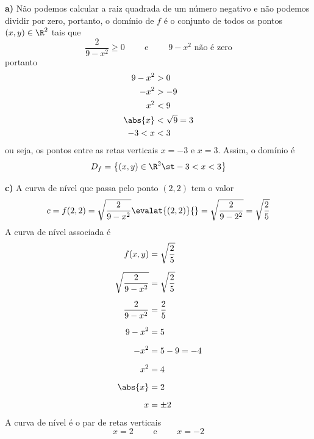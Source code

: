\documentclass[a4paper,12pt,fleqn]{article}
\begin{document}
\begin{answer}
  \textbf{a)} \quad
  Não podemos calcular a raiz quadrada de um número negativo e não
  podemos dividir por zero, portanto, o domínio de $f$ é o conjunto
  de todos os pontos \((x, y)\in\R^2\) tais que
  \[
    \frac{2}{9 - x^2} \geq 0 \qquad\text{ e }\qquad 9 - x^2 \text{ não é zero}
  \]
  portanto
  \begin{align*}
    9 - x^2 & > 0            \\
    -x^2    & > -9           \\
    x^2     & < 9            \\
    \abs{x} & < \sqrt{9} = 3 \\
    -3 < x  & < 3
  \end{align*}
  ou seja, os pontos entre as retas verticais \(x=-3\) e \(x=3\).
  Assim, o domínio é
  \[
    D_f = \left\{(x, y) \in \R^2 \st -3 < x < 3 \right\}
  \]

  \bigskip
  \textbf{c)} \quad
  A curva de nível que passa pelo ponto $(2, 2)$ tem o valor
  \[
    c
    = f(2, 2)
    = \sqrt{\frac{2}{9 - x^2}} \evalat{(2, 2)}{}
    = \sqrt{\frac{2}{9 - 2^2}}
    = \sqrt{\frac{2}{5}}
  \]
  A curva de nível associada é
  \begin{align*}
    f(x, y)                  & = \sqrt{\frac{2}{5}} \\[2mm]
    \sqrt{\frac{2}{9 - x^2}} & = \sqrt{\frac{2}{5}} \\[2mm]
    \frac{2}{9 - x^2}        & = \frac{2}{5}        \\[2mm]
    9 - x^2                  & = 5                  \\[2mm]
    - x^2                    & = 5 - 9 = -4         \\[2mm]
    x^2                      & = 4                  \\[2mm]
    \abs{x}                  & = 2                  \\[2mm]
    x                        & = \pm 2
  \end{align*}
  A curva de nível é o par de retas verticais
  \[
    x = 2
    \qquad\text{ e }\qquad
    x = -2
  \]
\end{answer}

\end{document}
